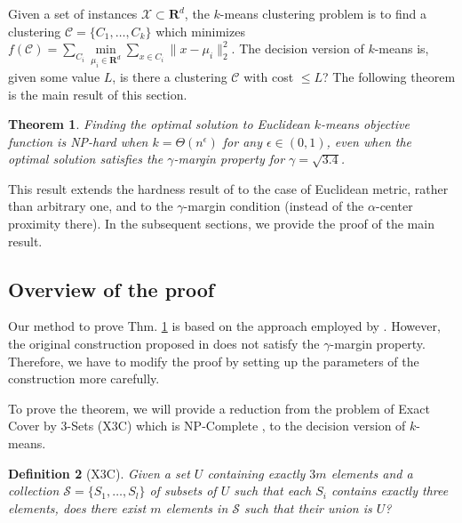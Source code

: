 \documentclass[12pt]{article}
\newcommand{\mc}{\mathcal}
\newcommand{\mb}{\mathbf}
\newtheorem{theorem}{Theorem}
\newtheorem{definition}[theorem]{Definition}
\begin{document}
Given a set of instances $\mc X \subset \mb R ^d$, the $k$-means clustering problem is to find a clustering $\mc C = \{C_1, \ldots, C_k\}$ which minimizes $f(\mc C) = \sum\limits_{C_i} \min\limits_{\mu_i\in {\mb R}^d}\sum\limits_{x\in C_i} \|x - \mu_i \|_2^2$. The decision version of $k$-means is, given some value $L$, is there a clustering $\mc C$ with cost $\le L$? The following theorem is the main result of this section. 

\begin{theorem}
\label{thm:gammaLower}
Finding the optimal solution to Euclidean $k$-means objective function is NP-hard when $k=\Theta(n^\epsilon)$ for any $\epsilon \in (0,1)$, even when the optimal solution satisfies the $\gamma$-margin property for $\gamma = \sqrt{3.4}$.
\end{theorem}

This result extends the hardness result of \cite{ben2014data} to the case of Euclidean metric, rather than arbitrary one, and to the $\gamma$-margin condition (instead of the $\alpha$-center proximity there). In the subsequent sections, we provide the proof of the main result. 

\subsection{Overview of the proof}

Our method to prove Thm. \ref{thm:gammaLower} is based on the approach employed by \cite{vattani2009hardness}. However, the original construction proposed in \cite{vattani2009hardness} does not satisfy the $\gamma$-margin property. Therefore, we have to modify the proof by setting up the parameters of the construction more carefully. 

To prove the theorem, we will provide a reduction from the problem of Exact Cover by 3-Sets (\textsc{X3C}) which is NP-Complete \cite{garey2002computers}, to the decision version of $k$-means.

\begin{definition}[\textsc{X3C}]
Given a set $U$ containing exactly $3m$ elements and a collection $\mc S = \{S_1, \ldots, S_l\}$ of subsets of $U$ such that each $S_i$ contains exactly three elements, does there exist $m$ elements in $\mc S$ such that their union is $U$? 
\end{definition}
\end{document}
